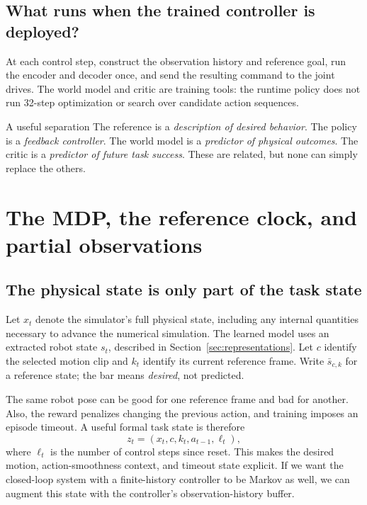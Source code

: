 \documentclass[11pt,a4paper]{article}
\begin{document}
\subsection{What runs when the trained controller is deployed?}
At each control step, construct the observation history and reference goal, run
the encoder and decoder once, and send the resulting command to the joint drives.
The world model and critic are training tools: the runtime policy does not run
32-step optimization or search over candidate action sequences.

\begin{idea}{A useful separation}
The reference is a \emph{description of desired behavior}. The policy is a
\emph{feedback controller}. The world model is a \emph{predictor of physical outcomes}.
The critic is a \emph{predictor of future task success}. These are related, but
none can simply replace the others.
\end{idea}

\section{The MDP, the reference clock, and partial observations}\label{sec:mdp}
\subsection{The physical state is only part of the task state}
Let $x_t$ denote the simulator's full physical state, including any internal
quantities necessary to advance the numerical simulation. The learned model
uses an extracted robot state $s_t$, described in Section~\ref{sec:representations}.
Let $c$ identify the selected motion clip and $k_t$ identify its current reference
frame. Write $\bar s_{c,k}$ for a reference state; the bar means \emph{desired},
not predicted.

The same robot pose can be good for one reference frame and bad for another.
Also, the reward penalizes changing the previous action, and training imposes an
episode timeout. A useful formal task state is therefore
\begin{equation}
z_t=(x_t,c,k_t,a_{t-1},\ell_t),
\end{equation}
where $\ell_t$ is the number of control steps since reset. This makes the desired
motion, action-smoothness context, and timeout state explicit. If we want the
closed-loop system with a finite-history controller to be Markov as well, we can
augment this state with the controller's observation-history buffer.
\end{document}
